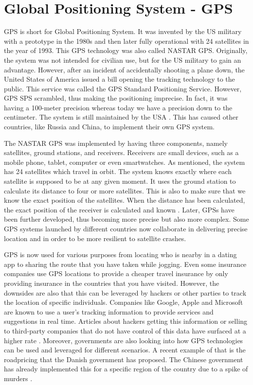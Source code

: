 \section{Global Positioning System - GPS}
GPS is short for Global Positioning System. It was invented by the US military with a prototype in the 1980s and then later fully operational with 24 satellites in the year of 1993. This GPS technology was also called NASTAR GPS. Originally, the system was not intended for civilian use, but for the US military to gain an advantage. However, after an incident of accidentally shooting a plane down, the United States of America issued a bill opening the tracking technology to the public. This service was called the GPS Standard Positioning Service. However, GPS SPS scrambled, thus making the positioning imprecise. In fact, it was having a 100-meter precision whereas today we have a precision down to the centimeter. The system is still maintained by the USA \cite{wiki:gps}. This has caused other countries, like Russia and China, to implement their own GPS system.

The NASTAR GPS was implemented by having three components, namely satellites, ground stations, and receivers. Receivers are small devices, such as a mobile phone, tablet, computer or even smartwatches. As mentioned, the system has 24 satellites which travel in orbit. The system knows exactly where each satellite is supposed to be at any given moment. It uses the ground station to calculate its distance to four or more satellites. This is also to make sure that we know the exact position of the satellites. When the distance has been calculated, the exact position of the receiver is calculated and known \cite{nasa:gps}. Later, GPSs have been further developed, thus becoming more precise but also more complex. Some GPS systems launched by different countries now collaborate in delivering precise location and in order to be more resilient to satellite crashes. 

GPS is now used for various purposes from locating who is nearby in a dating app to sharing the route that you have taken while jogging. Even some insurance companies use GPS locations to provide a cheaper travel insurance by only providing insurance in the countries that you have visited. However, the downsides are also that this can be leveraged by hackers or other parties to track the location of specific individuals. Companies like Google, Apple and Microsoft are known to use a user's tracking information to provide services and suggestions in real time. Articles about hackers getting this information or selling to third-party companies that do not have control of this data have surfaced at a higher rate \cite{newyorktimes:facebook}. Moreover, governments are also looking into how GPS technologies can be used and leveraged for different scenarios. A recent example of that is the roadpricing that the Danish government has proposed. The Chinese government has already implemented this for a specific region of the country due to a spike of murders \cite{guardian:2017}.


